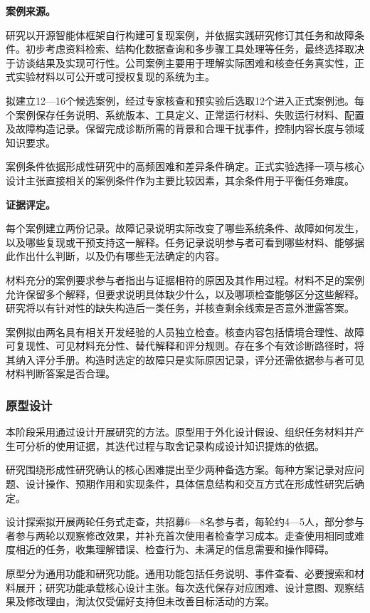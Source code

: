 \noindent\textbf{案例来源。}

研究以开源智能体框架自行构建可复现案例，并依据实践研究修订其任务和故障条件。初步考虑资料检索、结构化数据查询和多步骤工具处理等任务，最终选择取决于访谈结果及实现可行性。公司案例主要用于理解实际困难和核查任务真实性，正式实验材料以可公开或可授权复现的系统为主。

拟建立12—16个候选案例，经过专家核查和预实验后选取12个进入正式案例池。每个案例保存任务说明、系统版本、工具定义、正常运行材料、失败运行材料、配置及故障构造记录。保留完成诊断所需的背景和合理干扰事件，控制内容长度与领域知识要求。

案例条件依据形成性研究中的高频困难和差异条件确定。正式实验选择一项与核心设计主张直接相关的案例条件作为主要比较因素，其余条件用于平衡任务难度。

\noindent\textbf{证据评定。}

每个案例建立两份记录。故障记录说明实际改变了哪些系统条件、故障如何发生，以及哪些复现或干预支持这一解释。任务记录说明参与者可看到哪些材料、能够据此作出什么判断，以及仍有哪些无法确定的内容。

材料充分的案例要求参与者指出与证据相符的原因及其作用过程。材料不足的案例允许保留多个解释，但要求说明具体缺少什么，以及哪项检查能够区分这些解释。研究将以有针对性的缺失构造后一类任务，并核查剩余线索是否意外泄露答案。

案例拟由两名具有相关开发经验的人员独立检查。核查内容包括情境合理性、故障可复现性、可见材料充分性、替代解释和评分规则。存在多个有效诊断路径时，将其纳入评分手册。构造时选定的故障只是实际原因记录，评分还需依据参与者可见材料判断答案是否合理。

\subsubsection{原型设计}

本阶段采用通过设计开展研究的方法。原型用于外化设计假设、组织任务材料并产生可分析的使用证据，其迭代过程与取舍记录构成设计知识提炼的依据。

研究围绕形成性研究确认的核心困难提出至少两种备选方案。每种方案记录对应问题、设计操作、预期作用和实现条件，具体信息结构和交互方式在形成性研究后确定。

设计探索拟开展两轮任务式走查，共招募6—8名参与者，每轮约4—5人，部分参与者参与两轮以观察修改效果，并补充首次使用者检查学习成本。走查使用相同或难度相近的任务，收集理解错误、检查行为、未满足的信息需要和操作障碍。

原型分为通用功能和研究功能。通用功能包括任务说明、事件查看、必要搜索和材料展开；研究功能承载核心设计主张。每次迭代保存对应困难、设计意图、观察结果及修改理由，淘汰仅受偏好支持但未改善目标活动的方案。

